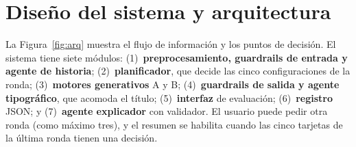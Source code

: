 \documentclass[10pt,a4paper,twocolumn]{article}
\begin{document}
\section{Diseño del sistema y arquitectura}\label{sec:arq}
La Figura~\ref{fig:arq} muestra el flujo de información y los puntos de decisión. El sistema tiene siete módulos:
(1)~\textbf{preprocesamiento, guardrails de entrada y agente de historia};
(2)~\textbf{planificador}, que decide las cinco configuraciones de la ronda;
(3)~\textbf{motores generativos} A y B;
(4)~\textbf{guardrails de salida y agente tipográfico}, que acomoda el título;
(5)~\textbf{interfaz} de evaluación;
(6)~\textbf{registro} JSON; y
(7)~\textbf{agente explicador} con validador.
El usuario puede pedir otra ronda (como máximo tres), y el resumen se habilita cuando las cinco tarjetas de la última ronda tienen una decisión.
\end{document}
